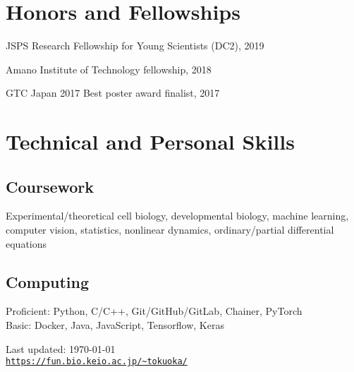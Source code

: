 \documentclass[letterpaper]{article}
\def\footerlink{https://fun.bio.keio.ac.jp/\~tokuoka/}
\renewenvironment{itemize}{
  \begin{list}{}{
    \setlength{\leftmargin}{1.5em}
  }
}{
  \end{list}
}
\begin{document}
\section*{\bf Honors and Fellowships}
\vspace{-0.6cm}
\hrulefill

\begin{itemize}
 \item JSPS Research Fellowship for Young Scientists (DC2), 2019
 \item Amano Institute of Technology fellowship, 2018
 \item GTC Japan 2017 Best poster award finalist, 2017
       \\
\end{itemize}


\section*{\bf Technical and Personal Skills}
\vspace{-0.6cm}
\hrulefill
\vspace{-0.3cm}

\subsection*{\bf Coursework}
Experimental/theoretical cell biology, developmental biology, machine
learning, computer vision, statistics, nonlinear dynamics,
ordinary/partial differential equations

\subsection*{\bf Computing}
Proficient: Python, C/C++, Git/GitHub/GitLab, Chainer, PyTorch \\
Basic: Docker, Java, JavaScript, Tensorflow, Keras

\bigskip

\begin{center}
  \begin{footnotesize}
    Last updated: \today \\
    \href{\footerlink}{\texttt{\url{\footerlink}}}
  \end{footnotesize}
\end{center}
\end{document}
